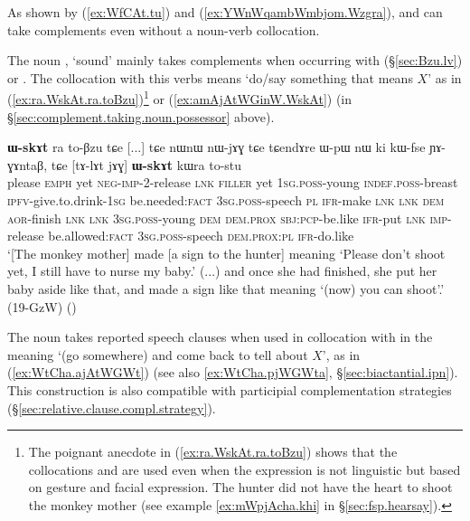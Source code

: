 As shown by (\ref{ex:WfCAt.tu}) and (\ref{ex:YWnWqambWmbjom.Wzgra}),  and  can take complements even without a noun-verb collocation. 

The noun , `sound' mainly takes complements when occurring with  (§\ref{sec:Bzu.lv}) or . The collocation with this verbs means `do/say something that means $X$' as in (\ref{ex:ra.WskAt.ra.toBzu})\footnote{The poignant anecdote in (\ref{ex:ra.WskAt.ra.toBzu}) shows that the collocations  and  are used even when the expression is not linguistic but based on gesture and facial expression. The hunter did not have the heart to shoot the monkey mother (see example \ref{ex:mWpjAcha.khi} in §\ref{sec:fsp.hearsay}). } or (\ref{ex:amAjAtWGinW.WskAt}) (in §\ref{sec:complement.taking.noun.possessor} above).

\begin{exe}
   \ex  \label{ex:ra.WskAt.ra.toBzu}
 \textbf{ɯ-skɤt} ra to-βzu tɕe [...] tɕe nɯnɯ nɯ-jɤɣ tɕe tɕendɤre ɯ-pɯ nɯ ki kɯ-fse ɲɤ-ɣɤntaβ,
tɕe [tɤ-lɤt jɤɣ] \textbf{ɯ-skɤt} kɯra to-stu \\
please \textsc{emph} yet \textsc{neg}-\textsc{imp}-2-release \textsc{lnk} \textsc{filler} yet \textsc{1sg}.\textsc{poss}-young \textsc{indef}.\textsc{poss}-breast \textsc{ipfv}-give.to.drink-\textsc{1sg} be.needed:\textsc{fact} \textsc{3sg}.\textsc{poss}-speech \textsc{pl} \textsc{ifr}-make \textsc{lnk} {  } \textsc{lnk} \textsc{dem} \textsc{aor}-finish \textsc{lnk} \textsc{lnk} \textsc{3sg}.\textsc{poss}-young \textsc{dem} \textsc{dem}.\textsc{prox} \textsc{sbj}:\textsc{pcp}-be.like \textsc{ifr}-put \textsc{lnk} \textsc{imp}-release be.allowed:\textsc{fact} \textsc{3sg}.\textsc{poss}-speech \textsc{dem}.\textsc{prox}:\textsc{pl} \textsc{ifr}-do.like \\
\glt `[The monkey mother] made [a sign to the hunter] meaning `Please don't shoot yet, I still have to nurse my baby.' (...) and once she had finished, she put her baby aside like that, and made a sign like that meaning `(now) you can shoot'.' (19-GzW)
()
\end{exe}

The noun  takes reported speech clauses when used in collocation with  in the meaning `(go somewhere) and come back to tell about $X$', as in (\ref{ex:WtCha.ajAtWGWt}) (see also \ref{ex:WtCha.pjWGWta}, §\ref{sec:biactantial.ipn}). This construction is also compatible with participial complementation strategies  (§\ref{sec:relative.clause.compl.strategy}).

